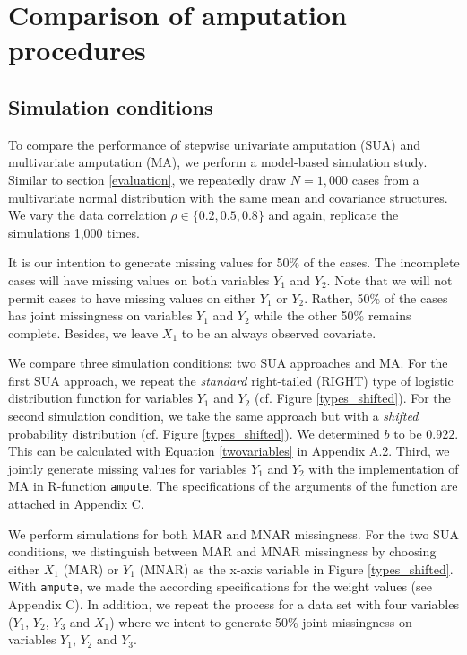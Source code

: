 \documentclass[11pt,a4paper]{article}
\newcommand{\code}[1]{\texttt{#1}}
\begin{document}
\section{Comparison of amputation procedures}\label{compare}

\subsection{\normalsize Simulation conditions}

To compare the performance of stepwise univariate amputation (SUA) and multivariate amputation (MA), we perform a model-based simulation study. Similar to section \ref{evaluation}, we repeatedly draw $N = 1,000$ cases from a multivariate normal distribution with the same mean and covariance structures. We vary the data correlation $\rho \in \{0.2, 0.5, 0.8\}$ and again, replicate the simulations 1,000 times. 

It is our intention to generate missing values for 50\% of the cases. The incomplete cases will have missing values on both variables $Y_1$ and $Y_2$. Note that we will not permit cases to have missing values on either $Y_1$ or $Y_2$. Rather, 50\% of the cases has joint missingness on variables $Y_1$ and $Y_2$ while the other 50\% remains complete. Besides, we leave $X_1$ to be an always observed covariate.

We compare three simulation conditions: two SUA approaches and MA. For the first SUA approach, we repeat the \textit{standard} right-tailed (RIGHT) type of logistic distribution function for variables $Y_1$ and $Y_2$ (cf. Figure \ref{types_shifted}). For the second simulation condition, we take the same approach but with a \textit{shifted} probability distribution (cf. Figure \ref{types_shifted}). We determined $b$ to be $0.922$. This can be calculated with Equation \eqref{twovariables} in Appendix A.2. Third, we jointly generate missing values for variables $Y_1$ and $Y_2$ with the implementation of MA in R-function \code{ampute}. The specifications of the arguments of the function are attached in Appendix C.

We perform simulations for both MAR and MNAR missingness. For the two SUA conditions, we distinguish between MAR and MNAR missingness by choosing either $X_1$ (MAR) or $Y_1$ (MNAR) as the x-axis variable in Figure \ref{types_shifted}. With \code{ampute}, we made the according specifications for the weight values (see Appendix C). In addition, we repeat the process for a data set with four variables ($Y_1$, $Y_2$, $Y_3$ and $X_1$) where we intent to generate 50\% joint missingness on variables $Y_1$, $Y_2$ and $Y_3$. 
\end{document}
